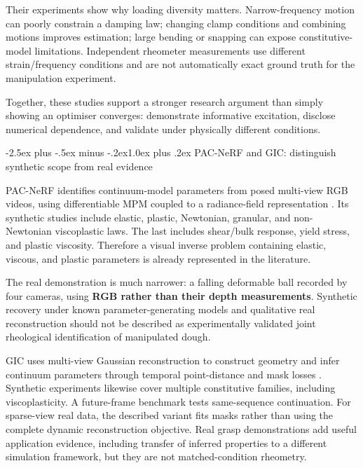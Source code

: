 \documentclass[
  11pt,
]{article}
\makeatletter
\renewcommand\subsection{\needspace{5\baselineskip}\@startsection{subsection}{2}{\z@}%
  {-2.5ex plus -.5ex minus -.2ex}{1.0ex plus .2ex}%
  {\normalfont\sffamily\large\bfseries\color{accent}}}
\makeatother
\begin{document}
Their experiments show why loading diversity matters. Narrow-frequency
motion can poorly constrain a damping law; changing clamp conditions and
combining motions improves estimation; large bending or snapping can
expose constitutive-model limitations. Independent rheometer
measurements use different strain/frequency conditions and are not
automatically exact ground truth for the manipulation experiment.

Together, these studies support a stronger research argument than simply
showing an optimiser converges: demonstrate informative excitation,
disclose numerical dependence, and validate under physically different
conditions.

\subsection{PAC-NeRF and GIC: distinguish synthetic scope from real
evidence}\label{pac-nerf-and-gic-distinguish-synthetic-scope-from-real-evidence}

PAC-NeRF identifies continuum-model parameters from posed multi-view RGB
videos, using differentiable MPM coupled to a radiance-field
representation . Its synthetic
studies include elastic, plastic, Newtonian, granular, and non-Newtonian
viscoplastic laws. The last includes shear/bulk response, yield stress,
and plastic viscosity. Therefore a visual inverse problem containing
elastic, viscous, and plastic parameters is already represented in the
literature.

The real demonstration is much narrower: a falling deformable ball
recorded by four cameras, using \textbf{RGB rather than their depth
measurements}. Synthetic recovery under known parameter-generating
models and qualitative real reconstruction should not be described as
experimentally validated joint rheological identification of manipulated
dough.

GIC uses multi-view Gaussian reconstruction to construct geometry and
infer continuum parameters through temporal point-distance and mask
losses . Synthetic experiments likewise
cover multiple constitutive families, including viscoplasticity. A
future-frame benchmark tests same-sequence continuation. For sparse-view
real data, the described variant fits masks rather than using the
complete dynamic reconstruction objective. Real grasp demonstrations add
useful application evidence, including transfer of inferred properties
to a different simulation framework, but they are not matched-condition
rheometry.
\end{document}
